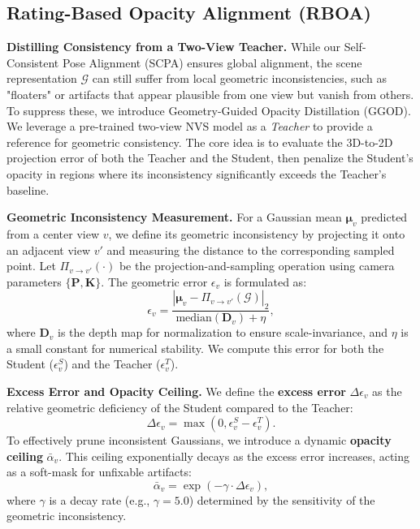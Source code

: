 \subsection{{Rating-Based Opacity Alignment (RBOA)}}

\noindent \textbf{Distilling Consistency from a Two-View Teacher.}
While our Self-Consistent Pose Alignment (SCPA) ensures global alignment, the scene representation $\mathcal{G}$ can still suffer from local geometric inconsistencies, such as "floaters" or artifacts that appear plausible from one view but vanish from others. 
To suppress these, we introduce Geometry-Guided Opacity Distillation (GGOD). 
We leverage a pre-trained two-view NVS model \cite{xu2025depthsplat} as a \textit{Teacher} to provide a reference for geometric consistency. 
The core idea is to evaluate the 3D-to-2D projection error of both the Teacher and the Student, then penalize the Student's opacity in regions where its inconsistency significantly exceeds the Teacher's baseline.

\noindent \textbf{Geometric Inconsistency Measurement.}
For a Gaussian mean $\mathbf{\mu}_v$ predicted from a center view $v$, we define its geometric inconsistency by projecting it onto an adjacent view $v'$ and measuring the distance to the corresponding sampled point. 
Let $\Pi_{v \to v'}(\cdot)$ be the projection-and-sampling operation using camera parameters $\{\mathbf{P}, \mathbf{K}\}$. 
The geometric error $\epsilon_v$ is formulated as:
\begin{equation}
    \epsilon_v = \frac{| \mathbf{\mu}_v - \Pi_{v \to v'}(\mathcal{G}) |_2}{\text{median}(\mathbf{D}_v) + \eta},
\end{equation}
where $\mathbf{D}_v$ is the depth map for normalization to ensure scale-invariance, and $\eta$ is a small constant for numerical stability. 
We compute this error for both the Student ($\epsilon_v^S$) and the Teacher ($\epsilon_v^T$).

\noindent \textbf{Excess Error and Opacity Ceiling.}
We define the \textbf{excess error} $\Delta \epsilon_v$ as the relative geometric deficiency of the Student compared to the Teacher:
\begin{equation}
    \Delta \epsilon_v = \max(0, \epsilon_v^S - \epsilon_v^T).
\end{equation}To effectively prune inconsistent Gaussians, we introduce a dynamic \textbf{opacity ceiling} $\bar{\alpha}_v$. 
This ceiling exponentially decays as the excess error increases, acting as a soft-mask for unfixable artifacts:
\begin{equation}
    \bar{\alpha}_v = \exp(-\gamma \cdot \Delta \epsilon_v),
\end{equation}
where $\gamma$ is a decay rate (e.g., $\gamma = 5.0$) determined by the sensitivity of the geometric inconsistency.


